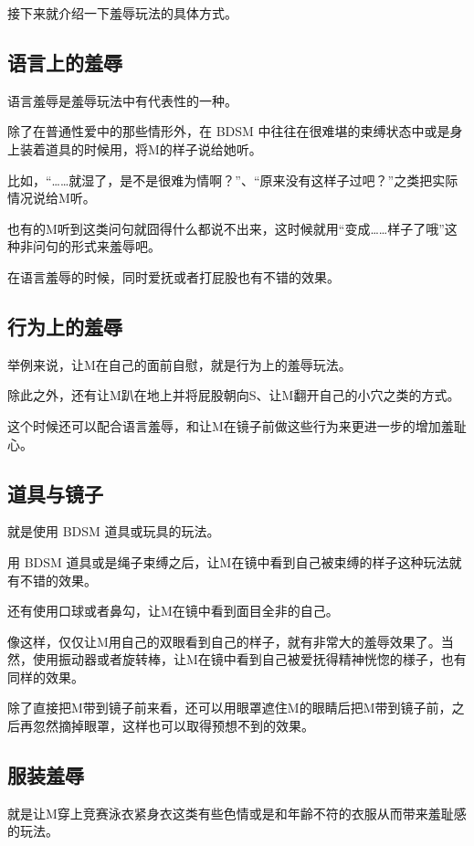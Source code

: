 \documentclass[12pt,UTF8]{ctexbook}
\begin{document}
接下来就介绍一下羞辱玩法的具体方式。 

\subsection{语言上的羞辱}

语言羞辱是羞辱玩法中有代表性的一种。

除了在普通性爱中的那些情形外，在 BDSM 中往往在很难堪的束缚状态中或是身上装着道具的时候用，将M的样子说给她听。

比如，“……就湿了，是不是很难为情啊？”、“原来没有这样子过吧？”之类把实际情况说给M听。

也有的M听到这类问句就囧得什么都说不出来，这时候就用“变成……样子了哦”这种非问句的形式来羞辱吧。

在语言羞辱的时候，同时爱抚或者打屁股也有不错的效果。 

\subsection{行为上的羞辱}

举例来说，让M在自己的面前自慰，就是行为上的羞辱玩法。

除此之外，还有让M趴在地上并将屁股朝向S、让M翻开自己的小穴之类的方式。

这个时候还可以配合语言羞辱，和让M在镜子前做这些行为来更进一步的增加羞耻心。 

\subsection{道具与镜子}

就是使用 BDSM 道具或玩具的玩法。

用 BDSM 道具或是绳子束缚之后，让M在镜中看到自己被束缚的样子这种玩法就有不错的效果。

还有使用口球或者鼻勾，让M在镜中看到面目全非的自己。

像这样，仅仅让M用自己的双眼看到自己的样子，就有非常大的羞辱效果了。当然，使用振动器或者旋转棒，让M在镜中看到自己被爱抚得精神恍惚的様子，也有同样的效果。

除了直接把M带到镜子前来看，还可以用眼罩遮住M的眼睛后把M带到镜子前，之后再忽然摘掉眼罩，这样也可以取得预想不到的效果。

\subsection{服装羞辱}

就是让M穿上竞赛泳衣紧身衣这类有些色情或是和年齢不符的衣服从而带来羞耻感的玩法。
\end{document}
